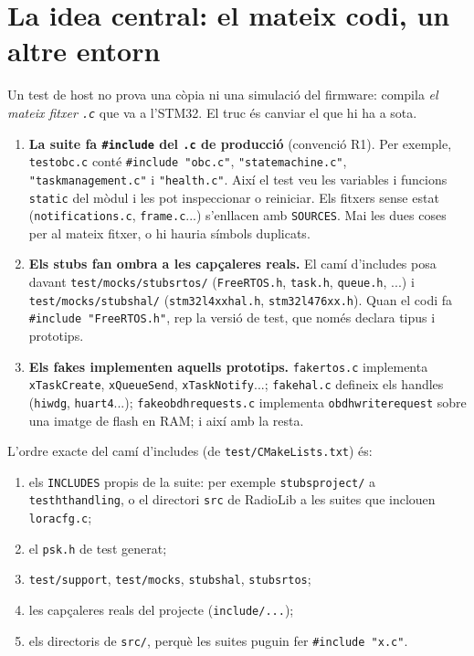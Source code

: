 \documentclass[11pt,a4paper]{article}
\DeclareRobustCommand{\_}{\textunderscore\allowbreak}
\newcommand{\cd}[1]{\texttt{#1}}
\begin{document}
\section{La idea central: el mateix codi, un altre entorn}\label{sec:idea}

Un test de host no prova una còpia ni una simulació del firmware: compila
\emph{el mateix fitxer \cd{.c}} que va a l'STM32. El truc és canviar el que hi ha
a sota.

\begin{enumerate}
\item \textbf{La suite fa \cd{\#include} del \cd{.c} de producció} (convenció R1). Per exemple,
  \cd{test\_obc.c} conté \cd{\#include "obc.c"}, \cd{"state\_machine.c"},
  \cd{"task\_management.c"} i \cd{"health.c"}. Així el test veu les variables i funcions
  \cd{static} del mòdul i les pot inspeccionar o reiniciar. Els fitxers sense estat
  (\cd{notifications.c}, \cd{frame.c}...) s'enllacen amb \cd{SOURCES}. Mai les dues coses
  per al mateix fitxer, o hi hauria símbols duplicats.
\item \textbf{Els stubs fan ombra a les capçaleres reals.} El camí d'includes posa davant
  \cd{test/mocks/stubs\_rtos/} (\cd{FreeRTOS.h}, \cd{task.h}, \cd{queue.h}, ...) i
  \cd{test/mocks/stubs\_hal/} (\cd{stm32l4xx\_hal.h}, \cd{stm32l476xx.h}). Quan el codi fa
  \cd{\#include "FreeRTOS.h"}, rep la versió de test, que només declara tipus i prototips.
\item \textbf{Els fakes implementen aquells prototips.} \cd{fake\_rtos.c} implementa
  \cd{xTaskCreate}, \cd{xQueueSend}, \cd{xTaskNotify}...; \cd{fake\_hal.c} defineix els
  handles (\cd{hiwdg}, \cd{huart4}...); \cd{fake\_obdh\_requests.c} implementa
  \cd{obdh\_write\_request} sobre una imatge de flash en RAM; i així amb la resta.
\end{enumerate}

L'ordre exacte del camí d'includes (de \cd{test/CMakeLists.txt}) és:
\begin{enumerate}[label=\arabic*.]
\item els \cd{INCLUDES} propis de la suite: per exemple \cd{stubs\_project/} a \cd{test\_ht\_handling},
  o el directori \cd{src} de RadioLib a les suites que inclouen \cd{lora\_cfg.c};
\item el \cd{psk.h} de test generat;
\item \cd{test/support}, \cd{test/mocks}, \cd{stubs\_hal}, \cd{stubs\_rtos};
\item les capçaleres reals del projecte (\cd{include/...});
\item els directoris de \cd{src/}, perquè les suites puguin fer \cd{\#include "x.c"}.
\end{enumerate}
\end{document}
